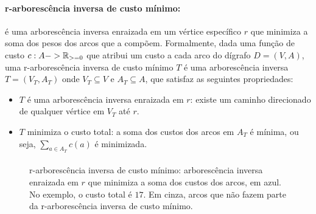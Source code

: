\documentclass[12pt,a4paper]{article}
\def\geq{\string>=}%
\def\to{->}%
\begin{document}
\paragraph{r-arborescência inversa de custo mínimo:}
é uma arborescência inversa enraizada em um vértice específico \(r\) que minimiza a soma dos pesos dos arcos que a compõem. Formalmente, dada uma função de custo \(c: A \to \mathbb{R}_{\geq 0}\) que atribui um custo a cada arco do dígrafo \(D = (V, A)\), uma r-arborescência inversa de custo mínimo \(T\) é uma arborescência inversa \(T = (V_T, A_T)\) onde \(V_T \subseteq V\) e \(A_T \subseteq A\), que satisfaz as seguintes propriedades:
\begin{itemize}
    \item \(T\) é uma arborescência inversa enraizada em \(r\): existe um caminho direcionado de qualquer vértice em \(V_T\) até \(r\).
    \item \(T\) minimiza o custo total: a soma dos custos dos arcos em \(A_T\) é mínima, ou seja, \(\sum_{a \in A_T} c(a)\) é minimizada.
\end{itemize}

\paragraph{}
\begin{figure}[H]
\centering
{}
\caption{r-arborescência inversa de custo mínimo: arborescência inversa enraizada em $r$ que minimiza a soma dos custos dos arcos, em azul. No exemplo, o custo total é $17$. Em cinza, arcos que não fazem parte da r-arborescência inversa de custo mínimo.}
\label{fig:r-arborescencia-inversa-custo-minimo}
\end{figure}
\end{document}
